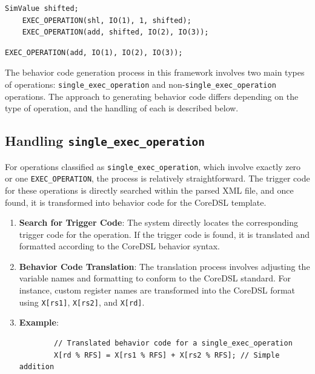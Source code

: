 \begin{lstlisting}[caption={Non-Single Exec Operation Semantics Example},captionpos=b]
    SimValue shifted;
    EXEC_OPERATION(shl, IO(1), 1, shifted);
    EXEC_OPERATION(add, shifted, IO(2), IO(3));
\end{lstlisting}
\begin{lstlisting}[caption={Single Exec Operation Semantics Example},captionpos=b]
    EXEC_OPERATION(add, IO(1), IO(2), IO(3));
\end{lstlisting}

The behavior code generation process in this framework involves two main types of operations: \texttt{single\_exec\_operation} and non-\texttt{single\_exec\_operation} operations. The approach to generating behavior code differs depending on the type of operation, and the handling of each is described below.

\subsection{Handling \texttt{single\_exec\_operation}}

For operations classified as \texttt{single\_exec\_operation}, which involve exactly zero or one \texttt{EXEC\_OPERATION}, the process is relatively straightforward. The trigger code for these operations is directly searched within the parsed XML file, and once found, it is transformed into behavior code for the CoreDSL template.

\begin{enumerate}
    \item \textbf{Search for Trigger Code}: The system directly locates the corresponding trigger code for the operation. If the trigger code is found, it is translated and formatted according to the CoreDSL behavior syntax.

    \item \textbf{Behavior Code Translation}: The translation process involves adjusting the variable names and formatting to conform to the CoreDSL standard. For instance, custom register names are transformed into the CoreDSL format using \texttt{X[rs1]}, \texttt{X[rs2]}, and \texttt{X[rd]}.

    \item \textbf{Example}:
    \begin{lstlisting}
        // Translated behavior code for a single_exec_operation
        X[rd % RFS] = X[rs1 % RFS] + X[rs2 % RFS]; // Simple addition
    \end{lstlisting}
\end{enumerate}

